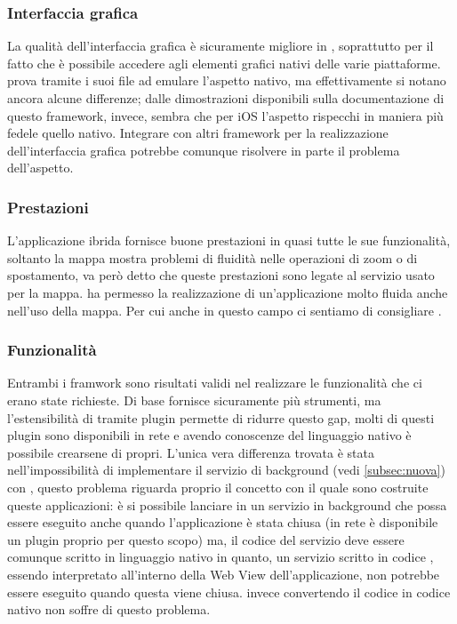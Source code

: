 		\subsubsection{Interfaccia grafica}
		La qualità dell'interfaccia grafica è sicuramente migliore in \tisdk{},
		soprattutto per il fatto che è possibile accedere agli elementi 
		grafici nativi delle varie piattaforme. \kendomob{} prova tramite i 
		suoi file \css{} ad emulare l'aspetto nativo, ma effettivamente si
        notano ancora alcune differenze; dalle dimostrazioni disponibili sulla 
		documentazione di questo framework, invece, sembra che per iOS l'aspetto 
		rispecchi in maniera più fedele quello nativo. Integrare \pg{} con 
		altri framework per la realizzazione dell'interfaccia grafica potrebbe 
		comunque risolvere in parte il problema dell'aspetto.
		\subsubsection{Prestazioni} 
		L'applicazione ibrida fornisce buone prestazioni in quasi tutte 
		le sue funzionalità, soltanto la mappa mostra problemi di fluidità 
		nelle operazioni di zoom o di spostamento, va però detto che queste 
		prestazioni sono legate al servizio usato per la mappa.
		\tisdk{} ha permesso la realizzazione di un'applicazione molto fluida 
		anche nell'uso della mappa. Per cui anche in questo campo ci sentiamo 
		di consigliare \tisdk{}.
		\subsubsection{Funzionalità}
		Entrambi i framwork sono risultati validi nel realizzare le 
		funzionalità che ci erano state richieste. Di base \tisdk{} fornisce 
		sicuramente più strumenti, ma l'estensibilità di \pg{} tramite plugin 
		permette di ridurre questo gap, molti di questi plugin sono 
		disponibili in rete e avendo conoscenze del linguaggio nativo è 
		possibile crearsene di propri. L'unica vera differenza 
		trovata è stata nell'impossibilità di implementare il servizio di 
		background (vedi \ref{subsec:nuova}) con \pg{}, questo problema 
		riguarda proprio il concetto con 
		il quale sono costruite queste applicazioni: è si possibile lanciare 
		in \js{}
		un servizio in background che possa essere eseguito anche quando 
		l'applicazione è stata chiusa (in rete è disponibile un plugin proprio 
		per questo scopo) ma, il codice del servizio deve essere comunque 
		scritto in linguaggio nativo in quanto, un servizio scritto in codice 
		\js{}, essendo interpretato all'interno della Web View  
		dell'applicazione, non potrebbe essere eseguito quando questa viene 
		chiusa.
		\tisdk{} invece convertendo il codice \js{} in codice nativo non 
		soffre di questo problema.
